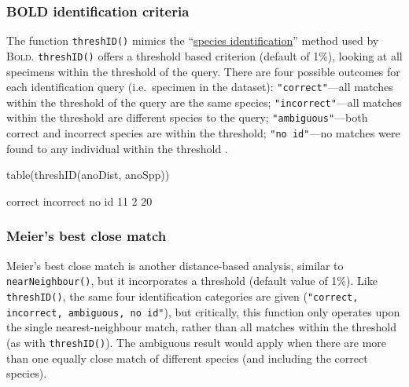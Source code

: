 \documentclass{article}
\newcommand{\progname}[1]{\textsc{#1}}
\newcommand{\fun}[1]{\texttt{#1}}
\begin{document}
\subsubsection{BOLD identification criteria}%
The function \fun{threshID()} mimics the ``\href{http://www.barcodinglife.com/views/idrequest.php}{species identification}'' method used by \progname{Bold}. \fun{threshID()} offers a threshold based criterion (default of 1\%), looking at all specimens within the threshold of the query. There are four possible outcomes for each identification query (i.e.\ specimen in the dataset): \fun{"correct"}---all matches within the threshold of the query are the same species; \fun{"incorrect"}---all matches within the threshold are different species to the query; \fun{"ambiguous"}---both correct and incorrect species are within the threshold; \fun{"no id"}---no matches were found to any individual within the threshold . 

\begin{console}
table(threshID(anoDist, anoSpp))
\end{console}

\begin{Routput}
  correct incorrect     no id 
       11         2        20 
\end{Routput}

\subsubsection{Meier's best close match}
Meier's best close match \citep{Meier.2006} is another distance-based analysis, similar to \fun{nearNeighbour()}, but it incorporates a threshold (default value of 1\%). Like \fun{threshID()}, the same four identification categories are given (\fun{"correct, incorrect, ambiguous, no id"}), but critically, this function only operates upon the single nearest-neighbour match, rather than all matches within the threshold (as with \fun{threshID()}). The ambiguous result would apply when there are more than one equally close match of different species (and including the correct species). 

\end{document}
